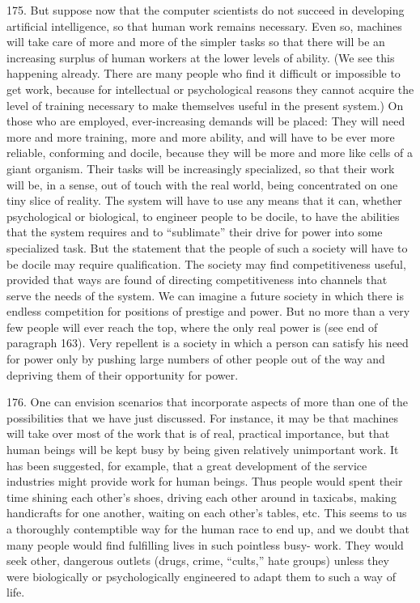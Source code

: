 \documentclass{article}
\begin{document}
175. But suppose now that the computer scientists do not succeed in developing artificial 
intelligence, so that human work remains necessary. Even so, machines will take care of more and 
more of the simpler tasks so that there will be an increasing surplus of human workers at the lower 
levels of ability. (We see this happening already. There are many people who find it difficult or 
impossible to get work, because for intellectual or psychological reasons they cannot acquire the 
level of training necessary to make themselves useful in the present system.) On those who are 
employed, ever-increasing demands will be placed: They will need more and more training, more 
and more ability, and will have to be ever more reliable, conforming and docile, because they will 
be more and more like cells of a giant organism. Their tasks will be increasingly specialized, so 
that their work will be, in a sense, out of touch with the real world, being concentrated on one tiny 
slice of reality. The system will have to use any means that it can, whether psychological or 
biological, to engineer people to be docile, to have the abilities that the system requires and to 
“sublimate” their drive for power into some specialized task. But the statement that the people of 
such a society will have to be docile may require qualification. The society may find 
competitiveness useful, provided that ways are found of directing competitiveness into channels 
that serve the needs of the system. We can imagine a future society in which there is endless 
competition for positions of prestige and power. But no more than a very few people will ever 
reach the top, where the only real power is (see end of paragraph 163). Very repellent is a society 
in which a person can satisfy his need for power only by pushing large numbers of other people 
out of the way and depriving them of their opportunity for power. \vspace{\baselineskip}

176. One can envision scenarios that incorporate aspects of more than one of the possibilities that 
we have just discussed. For instance, it may be that machines will take over most of the work that 
is of real, practical importance, but that human beings will be kept busy by being given relatively 
unimportant work. It has been suggested, for example, that a great development of the service 
industries might provide work for human beings. Thus people would spent their time shining each 
other’s shoes, driving each other around in taxicabs, making handicrafts for one another, waiting 
on each other’s tables, etc. This seems to us a thoroughly contemptible way for the human race to 
end up, and we doubt that many people would find fulfilling lives in such pointless busy-
work. They would seek other, dangerous outlets (drugs, crime, “cults,” hate groups) unless they 
were biologically or psychologically engineered to adapt them to such a way of life. \vspace{\baselineskip}
\end{document}

